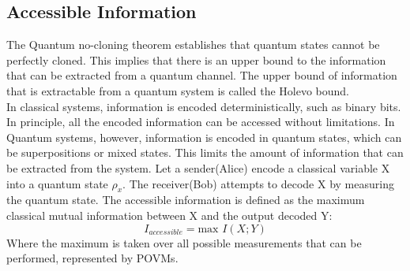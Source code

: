 \subsection{Accessible Information}

The Quantum no-cloning theorem establishes that quantum states cannot be perfectly cloned. This implies that there is an upper bound to the information that can be extracted from a quantum channel. The upper bound of information that is extractable from a quantum system is called the Holevo bound.\\
In classical systems, information is encoded deterministically, such as binary bits. In principle, all the encoded information can be accessed without limitations. In Quantum systems, however, information is encoded in quantum states, which can be superpositions or mixed states. This limits the amount of information that can be extracted from the system.
\newline
Let a sender(Alice) encode a classical variable X into a quantum state $\rho_x$. The receiver(Bob) attempts to decode X by measuring the quantum state. The accessible information is defined as the maximum classical mutual information between X and the output decoded Y:
\[
I_{accessible} = \text{max } I(X;Y)
\]
Where the maximum is taken over all possible measurements that can  be performed, represented by POVMs.

